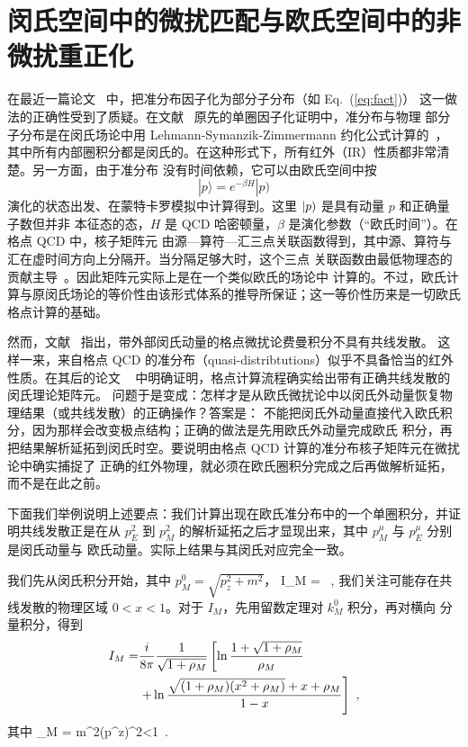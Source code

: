 \section{闵氏空间中的微扰匹配与欧氏空间中的非微扰重正化}

在最近一篇论文~\cite{Carlson:2017gpk} 中，把准分布因子化为部分子分布（如 Eq.~(\ref{eq:fact})）
这一做法的正确性受到了质疑。在文献~\cite{Xiong:2013bka} 原先的单圈因子化证明中，准分布与物理
部分子分布是在闵氏场论中用 Lehmann-Symanzik-Zimmermann 约化公式计算的~\cite{Sterman:1994ce}，
其中所有内部圈积分都是闵氏的。在这种形式下，所有红外（IR）性质都非常清楚。另一方面，由于准分布
没有时间依赖，它可以由欧氏空间中按
\begin{equation}
|p\rangle = e^{-\beta H}|p)
\end{equation}
演化的状态出发、在蒙特卡罗模拟中计算得到。这里 $|p\rm{)}$ 是具有动量 $p$ 和正确量子数但并非
本征态的态，$H$ 是 QCD 哈密顿量，$\beta$ 是演化参数（``欧氏时间''）。在格点 QCD 中，核子矩阵元
由源—算符—汇三点关联函数得到，其中源、算符与汇在虚时间方向上分隔开。当分隔足够大时，这个三点
关联函数由最低物理态的贡献主导~\cite{Rothe:1992nt}。因此矩阵元实际上是在一个类似欧氏的场论中
计算的。不过，欧氏计算与原闵氏场论的等价性由该形式体系的推导所保证；这一等价性历来是一切欧氏
格点计算的基础。

然而，文献~\cite{Carlson:2017gpk} 指出，带外部闵氏动量的格点微扰论费曼积分不具有共线发散。
这样一来，来自格点 QCD 的准分布（quasi-distribtutions）似乎不具备恰当的红外性质。在其后的论文
~\cite{Briceno:2017cpo} 中明确证明，格点计算流程确实给出带有正确共线发散的闵氏理论矩阵元。
问题于是变成：怎样才是从欧氏微扰论中以闵氏外动量恢复物理结果（或共线发散）的正确操作？答案是：
不能把闵氏外动量直接代入欧氏积分，因为那样会改变极点结构；正确的做法是先用欧氏外动量完成欧氏
积分，再把结果解析延拓到闵氏时空。要说明由格点 QCD 计算的准分布核子矩阵元在微扰论中确实捕捉了
正确的红外物理，就必须在欧氏圈积分完成之后再做解析延拓，而不是在此之前。

下面我们举例说明上述要点：我们计算出现在欧氏准分布中的一个单圈积分，并证明共线发散正是在从
$p_E^2$ 到 $p_M^2$ 的解析延拓之后才显现出来，其中 $p_M^\mu$ 与 $p_E^\mu$ 分别是闵氏动量与
欧氏动量。实际上结果与其闵氏对应完全一致。

我们先从闵氏积分开始，其中 $p_M^0 = \sqrt{p_z^2+m^2}$，
\beq \label{eq:mloop}
I_M = \ ,
\eeq
我们关注可能存在共线发散的物理区域 $0<x<1$。对于 $I_M$，先用留数定理对 $k_M^0$ 积分，再对横向
分量积分，得到
\begin{align} 	\label{eq: im}
I_M =& {i\over 8\pi}{1\over \sqrt{1+\rho_M}}\left[\ln{1+\sqrt{1+\rho_M}\over \rho_M}\right.\nonumber\\
&\left. +\ln{\sqrt{(1+\rho_M)(x^2+\rho_M)}+x+\rho_M\over 1-x}\right]\ ,
\end{align}
其中
\beq
\rho_M = {m^2\over (p^z)^2}<1\ .
\eeq

